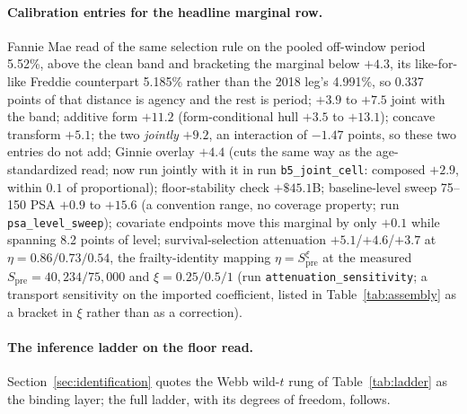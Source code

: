 \documentclass[12pt]{article}
\begin{document}
\paragraph{Calibration entries for the headline marginal row.} Fannie Mae read of the same selection rule on the pooled off-window period 5.52\%, above the clean band and bracketing the marginal below $+4.3$, its like-for-like Freddie counterpart 5.185\% rather than the 2018 leg's 4.991\%, so 0.337 points of that distance is agency and the rest is period; $+3.9$ to $+7.5$ joint with the band; additive form $+11.2$ (form-conditional hull $+3.5$ to $+13.1$); concave transform $+5.1$; the two \emph{jointly} $+9.2$, an interaction of $-1.47$ points, so these two entries do not add; Ginnie overlay $+4.4$ (cuts the same way as the age-standardized read; now run jointly with it in run \texttt{b5\_joint\_cell}: composed $+2.9$, within $0.1$ of proportional); floor-stability check $+\$45.1$B; baseline-level sweep 75--150 PSA $+0.9$ to $+15.6$ (a convention range, no coverage property; run \texttt{psa\_level\_sweep}); covariate endpoints move this marginal by only $+0.1$ while spanning 8.2 points of level; survival-selection attenuation $+5.1$/$+4.6$/$+3.7$ at $\eta = 0.86/0.73/0.54$, the frailty-identity mapping $\eta = S_{\mathrm{pre}}^{\xi}$ at the measured $S_{\mathrm{pre}} = 40{,}234/75{,}000$ and $\xi = 0.25/0.5/1$ (run \texttt{attenuation\_sensitivity}; a transport sensitivity on the imported coefficient, listed in Table~\ref{tab:assembly} as a bracket in $\xi$ rather than as a correction).

\paragraph{The inference ladder on the floor read.} Section~\ref{sec:identification} quotes the Webb wild-$t$ rung of Table~\ref{tab:ladder} as the binding layer; the full ladder, with its degrees of freedom, follows.
\end{document}
